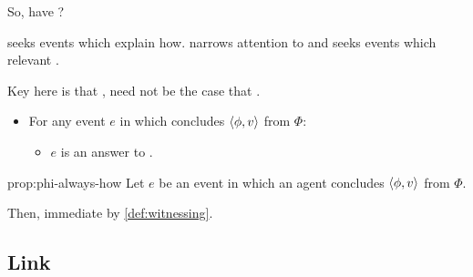 \begin{note}
  So, have \wit{}?

  \qHow{} seeks events which explain how.
  \qHowV{} narrows attention to \ros{} and seeks events which \wit{} relevant .

  Key here is that \supportII{}, need not be the case that \wit{}.
\end{note}

\begin{note}
  \begin{proposition}
    \label{prop:phi-always-how}

    \begin{itemize}
    \item
      For any event \(e\) in which \vAgent{} concludes \(\langle \phi, v \rangle\) from \(\Phi\):
      \begin{itemize}
      \item
        \(e\) is an answer to \qHowV{}.
      \end{itemize}
    \end{itemize}
    \vspace{-\baselineskip}
  \end{proposition}

  \begin{argument}{prop:phi-always-how}
    Let \(e\) be an event in which an agent concludes \(\langle \phi, v \rangle\) from \(\Phi\).

    Then, immediate by \autoref{def:witnessing}.
  \end{argument}
\end{note}

\subsection{Link}
\label{cha:var:qhowv:sec:link}

